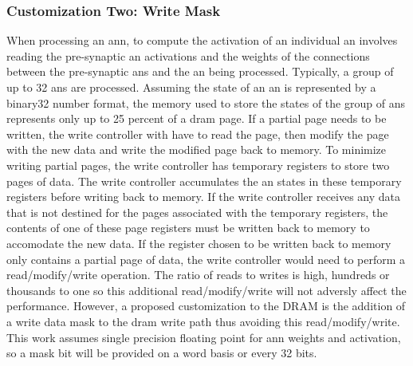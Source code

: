 \subsubsection{Customization Two: Write Mask}
\label{sec:Write Mask}
When processing an \ac{ann}, to compute the activation of an individual \ac{an} involves reading the pre-synaptic \ac{an} activations and the weights of the connections between the pre-synaptic \acp{an} and the \ac{an} being processed. 
Typically, a group of up to 32 \acp{an} are processed. Assuming the state of an \ac{an} is represented by a \ac{binary32} number format, the memory used to store the states of the group of \acp{an} represents only up to 25 percent of a \ac{dram} page.
If a partial page needs to be written, the write controller with have to read the page, then modify the page with the new data and write the modified page back to memory.
To minimize writing partial pages, the write controller has temporary registers to store two pages of data. 
The write controller accumulates the \ac{an} states in these temporary registers before writing back to memory.
If the write controller receives any data that is not destined for the pages associated with the temporary registers, the contents of one of these page registers must be written back to memory to accomodate the new data.
If the register chosen to be written back to memory only contains a partial page of data, the write controller would need to perform a read/modify/write operation.
The ratio of reads to writes is high, hundreds or thousands to one so this additional read/modify/write will not adversly affect the performance. 
However, a proposed customization to the DRAM is the addition of a write data mask to the \ac{dram} write path thus avoiding this read/modify/write.
This work assumes single precision floating point for \ac{ann} weights and activation, so a mask bit will be provided on a word basis or every 32 bits.

